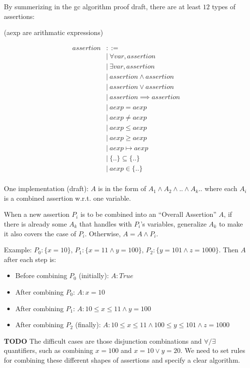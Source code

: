 \documentclass[12pt, fleqn]{article}
\begin{document}
\bigskip

By summerizing in the gc algorithm proof draft, there are at least
$12$ types of assertions:

(aexp are arithmatic expressions)

\begin{equation*}
\begin{aligned}
assertion &::=\\
&| \ \forall var, assertion\\
&| \ \exists var, assertion\\
&| \ assertion \land assertion\\
&| \ assertion \lor assertion\\
&| \ assertion \implies assertion\\
&| \ aexp = aexp\\
&| \ aexp \neq aexp\\
&| \ aexp \le aexp\\
&| \ aexp \ge aexp\\
&| \ aexp \mapsto aexp\\
&| \ \{ .. \} \subseteq \{ .. \}\\
&| \ aexp \in \{ .. \}\\
\end{aligned}
\end{equation*}

One implementation (draft): $A$ is in the form of $A_1 \land A_2 \land
.. \land A_k ..$ where each $A_i$ is a combined assertion w.r.t. one
variable.

When a new assertion $P_i$ is to be combined into an ``Overall
Assertion'' $A$, if there is already some $A_k$ that handles with
$P_i$'s variables, generalize $A_k$ to make it also covers
the case of $P_i$. Otherwise, $A = A \land P_i$.

Example: $P_0: \{ x = 10 \}$, $P_1: \{ x = 11 \land y = 100\}$, $P_2:
\{ y = 101 \land z = 1000 \}$. Then $A$ after each step is:

\begin{itemize}
\item Before combining $P_0$ (initially): $A: True$
\item After combining $P_0$: $A: x = 10$
\item After combining $P_1$: $A: 10 \le x \le 11 \land y = 100$
\item After combining $P_2$ (finally): $A: 10 \le x \le 11 \land 100 \le y \le 101 \land z = 1000 $
\end{itemize}

\textbf{TODO} The difficult cases are those disjunction combinations
and $\forall / \exists$ quantifiers, such as combining $x = 100$ and
$x = 10 \lor y = 20$. We need to set rules for combining these
different shapes of assertions and specify a clear algorithm.
\end{document}
